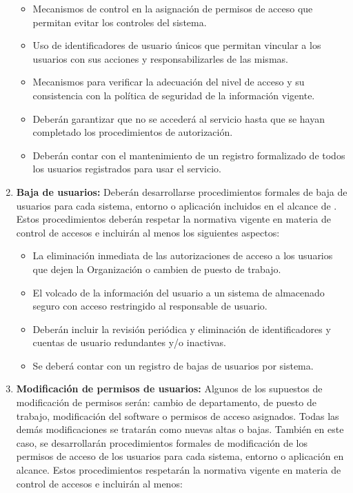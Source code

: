 \begin{enumerate}[label=\alph*)]
    \begin{itemize}
        \item Mecanismos de control en la asignación de permisos de acceso que permitan evitar los controles del sistema.
        \item Uso de identificadores de usuario únicos que permitan vincular a los usuarios con sus acciones y responsabilizarles de las mismas.
        \item Mecanismos para verificar la adecuación del nivel de acceso y su consistencia con la política de seguridad de la información vigente.
        \item Deberán garantizar que no se accederá al servicio hasta que se hayan completado los procedimientos de autorización.
        \item Deberán contar con el mantenimiento de un registro formalizado de todos los usuarios registrados para usar el servicio.
    \end{itemize}

    \item \textbf{Baja de usuarios:} Deberán desarrollarse procedimientos formales de baja de usuarios para cada sistema, entorno o aplicación incluidos en el alcance de \Beneficiario{}. Estos procedimientos deberán respetar la normativa vigente en materia de control de accesos e incluirán al menos los siguientes aspectos:

    \begin{itemize}
        \item La eliminación inmediata de las autorizaciones de acceso a los usuarios que dejen la Organización o cambien de puesto de trabajo.
        \item El volcado de la información del usuario a un sistema de almacenado seguro con acceso restringido al responsable de usuario.
        \item Deberán incluir la revisión periódica y eliminación de identificadores y cuentas de usuario redundantes y/o inactivas.
        \item Se deberá contar con un registro de bajas de usuarios por sistema.
    \end{itemize}

    \item \textbf{Modificación de permisos de usuarios:} Algunos de los supuestos de modificación de permisos serán: cambio de departamento, de puesto de trabajo, modificación del software o permisos de acceso asignados. Todas las demás modificaciones se tratarán como nuevas altas o bajas. También en este caso, se desarrollarán procedimientos formales de modificación de los permisos de acceso de los usuarios para cada sistema, entorno o aplicación en alcance. Estos procedimientos respetarán la normativa vigente en materia de control de accesos e incluirán al menos:


\end{enumerate}
